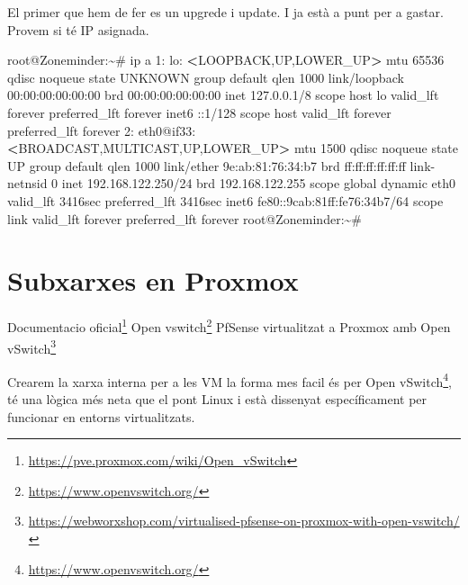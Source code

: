 \documentclass[
  10pt,
]{krantz}
\newenvironment{Shaded}{\begin{snugshade}}{\end{snugshade}}
\newcommand{\ExtensionTok}[1]{#1}
\newcommand{\NormalTok}[1]{#1}
\newcommand{\OperatorTok}[1]{\textcolor[rgb]{0.81,0.36,0.00}{\textbf{#1}}}
\DeclareRobustCommand{\href}[2]{#2\footnote{\url{#1}}}
\begin{document}
El primer que hem de fer es un upgrede i update. I ja està a punt per a gastar. Provem si té IP asignada.

\begin{Shaded}
\begin{Highlighting}[]
\ExtensionTok{root@Zoneminder:\textasciitilde{}\#}\NormalTok{ ip a}
\ExtensionTok{1:}\NormalTok{ lo: }\OperatorTok{\textless{}}\NormalTok{LOOPBACK,UP,LOWER\_UP}\OperatorTok{\textgreater{}}\NormalTok{ mtu 65536 qdisc noqueue state UNKNOWN}
\ExtensionTok{group}\NormalTok{ default qlen 1000}
    \ExtensionTok{link/loopback}\NormalTok{ 00:00:00:00:00:00 brd 00:00:00:00:00:00}
    \ExtensionTok{inet}\NormalTok{ 127.0.0.1/8 scope host lo}
       \ExtensionTok{valid\_lft}\NormalTok{ forever preferred\_lft forever}
    \ExtensionTok{inet6}\NormalTok{ ::1/128 scope host }
       \ExtensionTok{valid\_lft}\NormalTok{ forever preferred\_lft forever}
\ExtensionTok{2:}\NormalTok{ eth0@if33: }\OperatorTok{\textless{}}\NormalTok{BROADCAST,MULTICAST,UP,LOWER\_UP}\OperatorTok{\textgreater{}}\NormalTok{ mtu 1500 qdisc noqueue}
\ExtensionTok{state}\NormalTok{ UP group default qlen 1000}
    \ExtensionTok{link/ether}\NormalTok{ 9e:ab:81:76:34:b7 brd ff:ff:ff:ff:ff:ff link{-}netnsid 0}
    \ExtensionTok{inet}\NormalTok{ 192.168.122.250/24 brd 192.168.122.255 scope global dynamic eth0}
       \ExtensionTok{valid\_lft}\NormalTok{ 3416sec preferred\_lft 3416sec}
    \ExtensionTok{inet6}\NormalTok{ fe80::9cab:81ff:fe76:34b7/64 scope link }
       \ExtensionTok{valid\_lft}\NormalTok{ forever preferred\_lft forever}
\ExtensionTok{root@Zoneminder:\textasciitilde{}\#} 
\end{Highlighting}
\end{Shaded}

\hypertarget{subxarxes-en-proxmox}{%
\section{Subxarxes en Proxmox}\label{subxarxes-en-proxmox}}

\href{https://pve.proxmox.com/wiki/Open_vSwitch}{Documentacio oficial} \href{https://www.openvswitch.org/}{Open vswitch} \href{https://webworxshop.com/virtualised-pfsense-on-proxmox-with-open-vswitch/}{PfSense virtualitzat a Proxmox amb Open vSwitch}

Crearem la xarxa interna per a les VM la forma mes facil és per \href{https://www.openvswitch.org/}{Open vSwitch}, té una lògica més neta que el pont Linux i està dissenyat específicament per funcionar en entorns virtualitzats.
\end{document}

